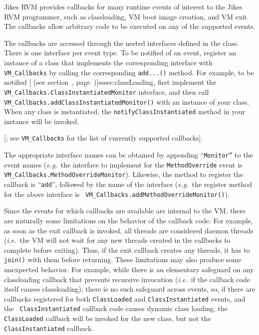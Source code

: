 
%
%
Jikes\TMweb{} RVM provides callbacks for many runtime events of
interest to the Jikes RVM 
programmer, such as classloading, VM boot image creation, and VM exit.  The
callbacks allow arbitrary code to be executed on any of the supported events.

The callbacks are accessed through the nested interfaces defined in the 
class.  There is one interface per event type.  To be notified
of an event, register an instance of a class that implements the corresponding
interface with {\tt VM\_Callbacks} by calling the corresponding {\tt add...()}
method.  For example, to be notified [ (see section~\Ref, page~\Pageref{})]{sssec:classLoading}, first implement the {\tt
VM\_Callbacks.ClassInstantiatedMonitor} interface, and then call {\tt
VM\_\-Call\-backs.add\-Class\-In\-stan\-ti\-a\-ted\-Mon\-i\-tor()} with an instance of your class.
When any class is instantiated, the {\tt notifyClassInstantiated} method in
your instance will be invoked.

[; see 
{\tt VM\_Callbacks} for the list of currently
supported callbacks]{\VMCallbacksURL}.

The appropriate interface names can be obtained by appending ``\texttt{Monitor''} to the
event names ({\it e.g.}\ the interface to implement for the {\tt MethodOverride} event
is {\tt VM\_\-Call\-backs.Me\-thod\-Ov\-er\-ride\-Mo\-ni\-tor}).  Likewise, the method to
register the callback is ``\texttt{add}'', followed by the name of the
interface ({\it e.g.}\ the register method for the above interface is {\tt
VM\_\-Call\-backs.add\-Me\-thod\-O\-ver\-ride\-Mon\-i\-tor()}).

Since the events for which callbacks are available are internal to the VM,
there are naturally some limitations on the behavior of the callback code.  For
example, as soon as the exit callback is invoked, all threads are considered
daemon threads ({\it i.e.}\ the VM will not wait for any new threads created in the
callbacks to complete before exiting).  Thus, if the exit callback creates any
threads, it has to {\tt join()} with them before returning.  These limitations
may also produce some unexpected behavior.  For example, while there is an
elementary safeguard on any classloading callback that prevents recursive
invocation ({\it i.e.}\ if the callback code itself causes classloading), there is no
such safeguard across events, so, if there are callbacks registered for both
{\tt ClassLoaded} and {\tt Class\-In\-stan\-ti\-a\-ted} events, and the {\tt
Class\-In\-stan\-ti\-a\-ted} callback code causes dynamic class loading, the {\tt
ClassLoaded} callback will be invoked for the new class, but not the {\tt
Class\-In\-stan\-ti\-a\-ted} callback.


